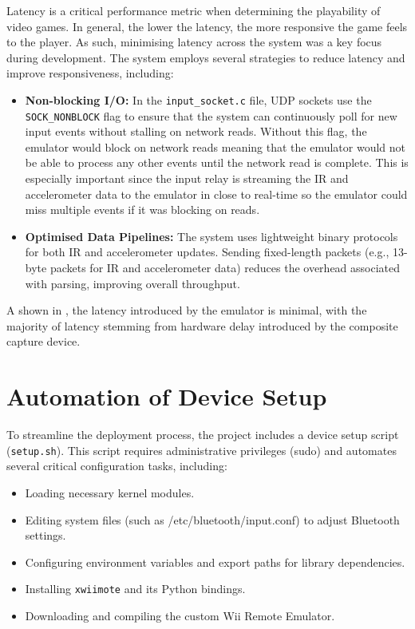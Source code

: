 Latency is a critical performance metric when determining the playability of video games. In general, the lower the latency, the more responsive the game feels to the player. As such, minimising latency across the system was a key focus during development. The system employs several strategies to reduce latency and improve responsiveness, including:

\begin{itemize}
	\item \textbf{Non-blocking I/O:} In the \texttt{input\_socket.c} file, UDP
	      sockets use the \linebreak \texttt{SOCK\_NONBLOCK} flag to ensure that the system
	      can continuously poll for new input events without stalling on network reads.
	      Without this flag, the emulator would block on network reads meaning that the
	      emulator would not be able to process any other events until the network read is
	      complete. This is especially important since the input relay is streaming the IR
	      and accelerometer data to the emulator in close to real-time so the emulator
	      could miss multiple events if it was blocking on reads.
	\item \textbf{Optimised Data Pipelines:} The system uses lightweight binary
	      protocols for both IR and accelerometer updates. Sending fixed-length packets
	      (e.g., 13-byte packets for IR and accelerometer data) reduces the overhead associated
	      with parsing, improving overall throughput.

\end{itemize}

A shown in , the latency introduced by the emulator is minimal, with the majority of latency stemming from hardware delay introduced by the composite capture device.

\section{Automation of Device Setup}

To streamline the deployment process, the project includes a device setup script (\texttt{setup.sh}). This script requires administrative privileges (sudo) and automates several critical configuration tasks, including:

\begin{itemize}

	\item Loading necessary kernel modules.
	\item Editing system files (such as /etc/bluetooth/input.conf) to adjust Bluetooth settings.
	\item Configuring environment variables and export paths for library dependencies.
	\item Installing \texttt{xwiimote} and its Python bindings.
	\item Downloading and compiling the custom Wii Remote Emulator.
\end{itemize}


